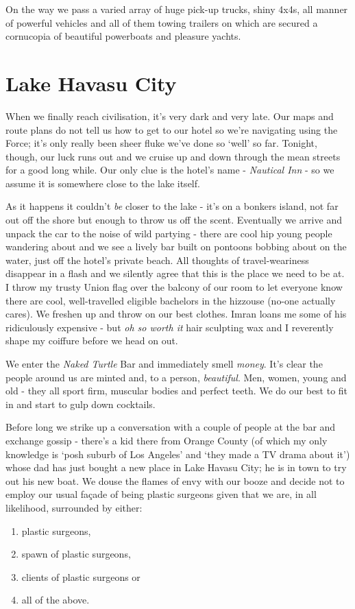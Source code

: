 \documentclass[a5paper,titlepage,11pt]{book}
\begin{document}
On the way we pass a varied array of huge pick-up trucks, shiny 4x4s, all manner of powerful vehicles and all of them towing trailers on which are secured a cornucopia of beautiful powerboats and pleasure yachts.


\section*{Lake Havasu City}
When we finally reach civilisation, it's very dark and very late. Our maps and route plans do not tell us how to get to our hotel so we're navigating using the Force; it's only really been sheer fluke we've done so `well' so far. Tonight, though, our luck runs out and we cruise up and down through the mean streets for a good long while. Our only clue is the hotel's name - \emph{Nautical Inn} - so we assume it is somewhere close to the lake itself.

As it happens it couldn't \emph{be} closer to the lake - it's on a bonkers island, not far out off the shore but enough to throw us off the scent. Eventually we arrive and unpack the car to the noise of wild partying - there are cool hip young people wandering about and we see a lively bar built on pontoons bobbing about on the water, just off the hotel's private beach. All thoughts of travel-weariness disappear in a flash and we silently agree that this is the place we need to be at. I throw my trusty Union flag over the balcony of our room to let everyone know there are cool, well-travelled eligible bachelors in the hizzouse (no-one actually cares). We freshen up and throw on our best clothes. Imran loans me some of his ridiculously expensive - but \emph{oh so worth it} hair sculpting wax and I reverently shape my coiffure before we head on out.

We enter the \emph{Naked Turtle} Bar and immediately smell \emph{money}. It's clear the people around us are minted and, to a person, \emph{beautiful}. Men, women, young and old - they all sport firm, muscular bodies and perfect teeth. We do our best to fit in and start to gulp down cocktails.

Before long we strike up a conversation with a couple of people at the bar and exchange gossip - there's a kid there from Orange County (of which my only knowledge is `posh suburb of Los Angeles' and `they made a TV drama about it') whose dad has just bought a new place in Lake Havasu City; he is in town to try out his new boat. We douse the flames of envy with our booze and decide not to employ our usual fa\c{c}ade of being plastic surgeons given that we are, in all likelihood, surrounded by either:
\begin{enumerate}
\item plastic surgeons,
\item spawn of plastic surgeons,
\item clients of plastic surgeons or
\item all of the above.
\end{enumerate}
\end{document}
